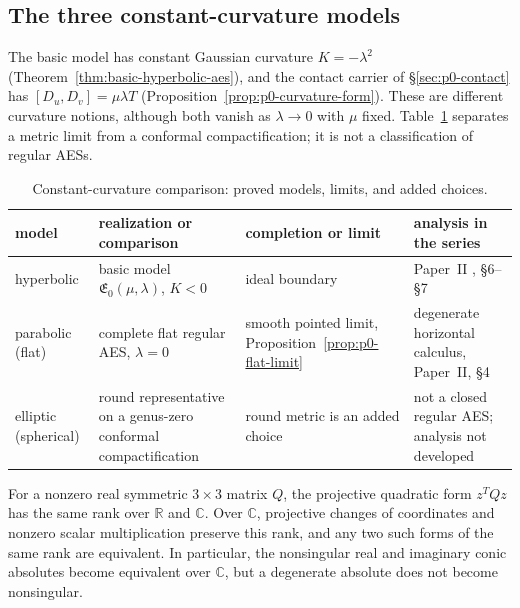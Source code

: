 \subsection{The three constant-curvature models}
\label{subsec:p0-three-models}

The basic model has constant Gaussian curvature $K=-\lambda^{2}$
(Theorem~\ref{thm:basic-hyperbolic-aes}), and the contact carrier of
\S\ref{sec:p0-contact} has $[D_u,D_v]=\mu\lambda T$
(Proposition~\ref{prop:p0-curvature-form}).  These are different curvature
notions, although both vanish as $\lambda\to0$ with $\mu$ fixed.
Table~\ref{tab:p0-three-models} separates a metric limit from a conformal
compactification; it is not a classification of regular AESs.

\begin{table}[htbp]
\centering
\small
\caption{Constant-curvature comparison: proved models, limits, and added choices.}
\label{tab:p0-three-models}
\begin{tabular}{@{}p{1.65cm}p{4.25cm}p{3.35cm}p{3.45cm}@{}}
\toprule
\raggedright model & \raggedright realization or comparison & \raggedright completion or limit & \raggedright analysis in the series \tabularnewline
\midrule
\raggedright hyperbolic & \raggedright basic model $\mathfrak E_0(\mu,\lambda)$, $K<0$ & \raggedright
ideal boundary & \raggedright
Paper~II \cite{Yuan2026AEGFunctionTheory}, \S6--\S7 \tabularnewline
\raggedright parabolic (flat) & \raggedright complete flat regular AES, $\lambda=0$ & \raggedright
smooth pointed limit, Proposition~\ref{prop:p0-flat-limit} & \raggedright
degenerate horizontal calculus, Paper~II, \S4 \tabularnewline
\raggedright elliptic (spherical) & \raggedright round representative on a genus-zero conformal compactification & \raggedright
round metric is an added choice & \raggedright
not a closed regular AES; analysis not developed \tabularnewline
\bottomrule
\end{tabular}
\end{table}

\begin{proposition}
\label{prop:p0-complex-conic-rank}
For a nonzero real symmetric $3\times3$ matrix $Q$, the projective quadratic
form $z^TQz$ has the same rank over $\mathbb R$ and $\mathbb C$.
Over $\mathbb C$, projective changes of coordinates and nonzero scalar
multiplication preserve this rank, and any two such forms of the same rank
are equivalent.  In particular, the nonsingular real and imaginary conic
absolutes become equivalent over $\mathbb C$, but a degenerate absolute
does not become nonsingular.
\end{proposition}

